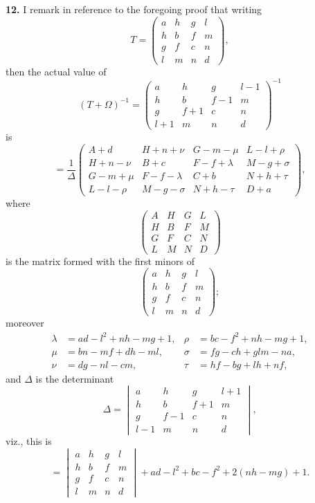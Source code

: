 \documentclass[11pt]{article}
\begin{document}
\textbf{12.} I remark in reference to the foregoing proof that writing
\[
T = \begin{pmatrix} a & h & g & l \\ h & b & f & m \\ g & f & c & n \\ l & m & n & d \end{pmatrix},
\]
then the actual value of
\[
(T + \Omega)^{-1} = \begin{pmatrix} a & h & g & l - 1 \\ h & b & f - 1 & m \\ g & f + 1 & c & n \\ l + 1 & m & n & d \end{pmatrix}^{-1}
\]
is
\[
= \frac{1}{\Delta} \begin{pmatrix} A + d & H + n + \nu & G - m - \mu & L - l + \rho \\ H + n - \nu & B + c & F - f + \lambda & M - g + \sigma \\ G - m + \mu & F - f - \lambda & C + b & N + h + \tau \\ L - l - \rho & M - g - \sigma & N + h - \tau & D + a \end{pmatrix},
\]
where
\[
\begin{pmatrix} A & H & G & L \\ H & B & F & M \\ G & F & C & N \\ L & M & N & D \end{pmatrix}
\]
is the matrix formed with the first minors of
\[
\begin{pmatrix} a & h & g & l \\ h & b & f & m \\ g & f & c & n \\ l & m & n & d \end{pmatrix};
\]
moreover
\begin{align*}
\lambda &= a d - l^{2} + n h - m g + 1, & \rho &= b c - f^{2} + n h - m g + 1, \\
\mu &= b n - m f + d h - m l, & \sigma &= f g - c h + g l m - n a, \\
\nu &= d g - n l - c m, & \tau &= h f - b g + l h + n f,
\end{align*}
and $\Delta$ is the determinant
\[
\Delta = \begin{vmatrix} a & h & g & l + 1 \\ h & b & f + 1 & m \\ g & f - 1 & c & n \\ l - 1 & m & n & d \end{vmatrix},
\]
viz., this is
\[
= \begin{vmatrix} a & h & g & l \\ h & b & f & m \\ g & f & c & n \\ l & m & n & d \end{vmatrix} + ad - l^{2} + bc - f^{2} + 2(nh - mg) + 1.
\]
\end{document}
